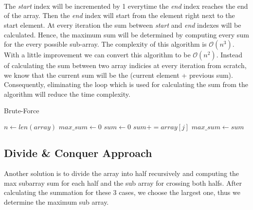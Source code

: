 \documentclass[twocolumns]{IEEEtran}
\begin{document}
\\ \\ \\
The \textit{start} index will be incremented by 1 everytime the \textit{end} index reaches the end of the array. Then the \textit{end} index will start from the element right next to the start element. At every iteration the sum between \textit{start} and \textit{end} indexes will be calculated. Hence, the maximum sum will be determined by computing every sum for the every possible sub-array. The complexity of this algorithm is $\mathcal{O}(n^3)$. With a little improvement we can convert this algorithm to be $\mathcal{O}(n^2)$. Instead of calculating the sum between two array indicies at every iteration from scratch, we know that the current sum will be the (current element + previous sum). Consequently, eliminating the loop which is used for calculating the sum from the algorithm will reduce the time complexity.
\newpage
\begin{algorithm}
	\caption{Brute-Force}
	\begin{algorithmic}[1]
		\State $n \leftarrow len(array)  $ 
		\State $max\_sum \leftarrow 0$ 
		 
			\State $sum \leftarrow 0$  
			 
			\State $sum += array[j]$ 
			 
				\State $max\_sum \leftarrow sum$  
			\EndIf
			\EndFor
		\EndFor
	\end{algorithmic}
\end{algorithm}
\subsection{Divide \& Conquer Approach}
Another solution is to divide the array into half recursively and computing the max subarray sum for each half and the sub array for crossing both halfs. After calculating the summation for these 3 cases, we choose the largest one, thus we determine the maximum sub array.\\ 
\end{document}
